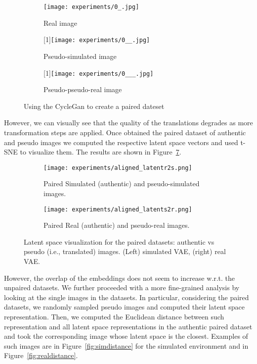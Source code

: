 \begin{figure}[h]
  \centering
  \begin{subfigure}{.33\linewidth}
	      \centering
	      \texttt{[image: experiments/0\_.jpg]}
	      \caption{Real image}\label{fig:real}
	  \end{subfigure}%
      \hfill
  \begin{subfigure}{.33\linewidth}
	      \centering
	      \scalebox{-1}[1]{\texttt{[image: experiments/0\_\_.jpg]}}
	      \caption{Pseudo-simulated image}\label{fig:psim}
	  \end{subfigure}%
  \hfill
  \begin{subfigure}{.33\linewidth}
	    \centering
	    \scalebox{-1}[1]{\texttt{[image: experiments/0\_\_\_.jpg]}}
	    \caption{Pseudo-pseudo-real image}\label{fig:ppreal}
	  \end{subfigure} 
  \caption{Using the CycleGan to create a paired dateset}
  \label{fig:examplealigned}
\end{figure}

However, we can visually see that the quality of the translations degrades as more transformation steps are applied. Once obtained the paired dataset of authentic and pseudo images we computed the respective latent space vectors and used t-SNE to visualize them. The results are shown in Figure~\ref{fig:latentpseudoaligned}.

\begin{figure}[h]
  \centering
  \begin{subfigure}{.5\linewidth}
	      \centering
	      \texttt{[image: experiments/aligned\_latentr2s.png]}
	      \caption{Paired Simulated (authentic) and pseudo-simulated images. }\label{fig:aligen_latentr2s}
	  \end{subfigure}%
      \hfill
  \begin{subfigure}{.5\linewidth}
	      \centering
	      \texttt{[image: experiments/aligned\_latents2r.png]}
	      \caption{Paired Real (authentic) and pseudo-real images.}\label{fig:aligen_latents2r}
	  \end{subfigure}
  \caption{Latent space visualization for the paired datasets: authentic vs pseudo (i.e., translated) images. (Left) simulated VAE, (right) real VAE.}
  \label{fig:latentpseudoaligned}
\end{figure}

However, the overlap of the embeddings does not seem to increase w.r.t. the unpaired datasets. We further proceeded with a more fine-grained analysis by looking at the single images in the datasets. In particular, considering the paired datasets, we randomly sampled pseudo images and computed their latent space representation. Then, we computed the Euclidean distance between such representation and all latent space representations in the authentic paired dataset and took the corresponding image whose latent space is the closest. Examples of such images are in Figure~\ref{fig:simdistance} for the simulated environment and in Figure~\ref{fig:realdistance}.

